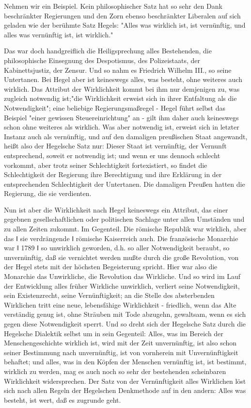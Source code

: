 Nehmen wir ein Beispiel. Kein philosophischer Satz hat so sehr
den Dank beschränkter Regierungen und den Zorn ebenso beschränkter
Liberalen auf sich geladen wie der berühmte Satz Hegels: "Alles was
wirklich ist, ist vernünftig, und alles was vernünftig ist, ist
wirklich."

Das war doch handgreiflich die Heiligsprechung alles
Bestehenden, die philosophische Einsegnung des Despotismus, des
Polizeistaats, der Kabinettsjustiz, der Zensur. Und so nahm es Friedrich
Wilhelm III., so seine Untertanen. Bei Hegel aber ist keineswegs alles,
was besteht, ohne weiteres auch wirklich. Das Attribut der Wirklichkeit
kommt bei ihm nur demjenigen zu, was zugleich notwendig ist;"die
Wirklichkeit erweist sich in ihrer Entfaltung als die Notwendigkeit";
eine beliebige Regierungsmaßregel - Hegel führt selbst das Beispiel
"einer gewissen Steuereinrichtung" an - gilt ihm daher auch keineswegs
schon ohne weiteres als wirklich. Was aber notwendig ist, erweist sich
in letzter Instanz auch als vernünftig, und auf den damaligen
preußischen Staat angewandt, heißt also der Hegelsche Satz nur: Dieser
Staat ist vernünftig, der Vernunft entsprechend, soweit er notwendig
ist; und wenn er uns dennoch schlecht vorkommt, aber trotz seiner
Schlechtigkeit fortexistiert, so findet die Schlechtigkeit der Regierung
ihre Berechtigung und ihre Erklärung in der entsprechenden
Schlechtigkeit der Untertanen. Die damaligen Preußen hatten die
Regierung, die sie verdienten.

Nun ist aber die Wirklichkeit nach Hegel keineswegs ein
Attribut, das einer gegebnen gesellschaftlichen oder politischen
Sachlage unter allen Umständen und zu allen Zeiten zukommt. Im
Gegenteil. Die römische Republik war wirklich, aber das ǁ sie
verdrängende ǁ römische Kaiserreich auch. Die französische Monarchie war
ǁ 1789 ǁ so unwirklich geworden, d.h. so aller Notwendigkeit beraubt, so
unvernünftig, daß sie vernichtet werden mußte durch die große
Revolution, von der Hegel stets mit der höchsten Begeisterung spricht.
Hier war also die Monarchie das Unwirkliche, die Revolution das
Wirkliche. Und so wird im Lauf der Entwicklung alles früher Wirkliche
unwirklich, verliert seine Notwendigkeit, sein Existenzrecht, seine
Vernünftigkeit; an die Stelle des absterbenden Wirklichen tritt eine
neue, lebensfähige Wirklichkeit - friedlich, wenn das Alte verständig
genug ist, ohne Sträuben mit Tode abzugehn, gewaltsam, wenn es sich
gegen diese Notwendigkeit sperrt. Und so dreht sich der Hegelsche Satz
durch die Hegelsche Dialektik selbst um in sein Gegenteil: Alles, was im
Bereich der Menschengeschichte wirklich ist, wird mit der Zeit
unvernünftig, ist also schon seiner Bestimmung nach unvernünftig, ist
von vornherein mit Unvernünftigkeit behaftet; und alles, was in den
Köpfen der Menschen vernünftig ist, ist bestimmt, wirklich zu werden,
mag es auch noch so sehr der bestehenden scheinbaren Wirklichkeit
widersprechen. Der Satz von der Vernünftigkeit alles Wirklichen löst
sich nach allen Regeln der Hegelschen Denkmethode auf in den andern:
Alles was besteht, ist wert, daß es zugrunde geht.

